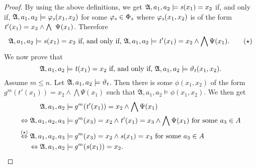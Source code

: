 \begin{proof}
	By using the above definitions, we get $\mathfrak A,a_1,a_2\models \operatorname{\mathit{s}}(x_1)=x_2$ if, and only if, $\mathfrak A,a_1,a_2\models \varphi_{\operatorname{\mathit{s}}}(x_1,x_2)$ for some $\varphi_{\operatorname{\mathit{s}}}\in\Phi_{\operatorname{\mathit{s}}}$ where $\varphi_{\operatorname{\mathit{s}}}(x_1,x_2)$ is of the form $\term t'(x_1)=x_2 \land \bigwedge \Psi(x_1)$.
	Therefore
	\begin{equation*}
		\mathfrak A, a_1,a_2 \models \operatorname{\mathit{s}}(x_1)=x_2 \text{ if, and only if, } \mathfrak A,a_1,a_2 \models \operatorname{\mathit{t}}'(x_1)=x_2 \land \bigwedge \Psi(x_1).
		\tag{$\star$}
		\label{eq:a}
	\end{equation*}
	We now prove that 
	$$\mathfrak A, a_1,a_2\models \operatorname{\mathit{t}}(x_1)=x_2 \text{ if, and only if, } \mathfrak A,a_1,a_2\models \vartheta_{\operatorname{\mathit{t}}}(x_1,x_2).$$
	Assume $m\leq n$.
	Let $\mathfrak A, a_1,a_2 \models \vartheta_{\operatorname{\mathit{t}}}$.
	Then there is some $\phi(x_1,x_2)$ of the form $g^{m}(t'(x_1))=x_2 \land \bigwedge \Psi(x_1)$ such that $\mathfrak A,a_1,a_2\models \phi(x_1,x_2)$.
	We then get
	\begin{align*}
		\mathfrak A,a_1,a_2 \models & \operatorname{\mathit{g}}^{m}(\operatorname{\mathit{t}}'(x_1))=x_2 \land \bigwedge \Psi(x_1) \\
		\Leftrightarrow \mathfrak A,a_1,a_2,a_3 \models & \operatorname{\mathit{g}}^{m}(x_3)=x_2 \land \operatorname{\mathit{t}}'(x_1)=x_3 \land \bigwedge \Psi(x_1) \text{ for some } a_3\in A \\
		\overset{(\star)}{\Leftrightarrow} \mathfrak A,a_1,a_2,a_3\models & \operatorname{\mathit{g}}^{m}(x_3)=x_2 \land \operatorname{\mathit{s}}(x_1)=x_3 \text{ for some } a_3\in A \\
		\Leftrightarrow \mathfrak A,a_1,a_2 \models & \operatorname{\mathit{g}}^{m}(\operatorname{\mathit{s}}(x_1))=x_2.
	\end{align*}
	

\end{proof}
